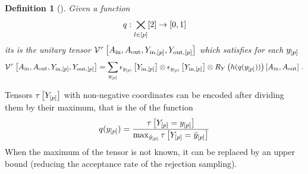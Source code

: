 \documentclass[aps,onecolumn,nofootinbib,pra]{article}
\newtheorem{definition}{Definition}
\begin{document}
    \begin{definition}[\ActivationCircuit{}]
        Given a function
        \begin{align*}
            q : \bigtimes_{l\in[p]} [2] \rightarrow [0,1]
        \end{align*}
        its \activationCircuit{} is the unitary tensor
        $\mathcal{V}^{\tau}\left[A_{\mathrm{in}},A_{\mathrm{out}},Y_{\mathrm{in},[p]},Y_{\mathrm{out},[p]}\right]$ which satisfies for each $y_{[p]}$
        \begin{align*}
            \mathcal{V}^{\tau}\left[A_{\mathrm{in}},A_{\mathrm{out}},Y_{\mathrm{in},[p]},Y_{\mathrm{out},[p]}\right]
            = \sum_{y_{[p]}} \epsilon_{y_{[p]}}\left[Y_{\mathrm{in},[p]}\right]
            \otimes \epsilon_{y_{[p]}}\left[Y_{\mathrm{in},[p]}\right]
            \otimes R_Y\left({h(q(y_{[p]}))}\right)\left[A_{\mathrm{in}},A_{\mathrm{out}}\right] \, .
        \end{align*}
    \end{definition}




    Tensors $\tau\left[Y_{[p]}\right]$ with non-negative coordinates can be encoded after dividing them by their maximum, that is the \activationCircuit{} of the function
    \begin{align*}
        q(y_{[p]}) = \frac{\tau\left[Y_{[p]}=y_{[p]}\right]}{\max_{\tilde{y}_{[p]}} \tau\left[Y_{[p]}=\tilde{y}_{[p]}\right]}
    \end{align*}
    When the maximum of the tensor is not known, it can be replaced by an upper bound (reducing the acceptance rate of the rejection sampling).
\end{document}
